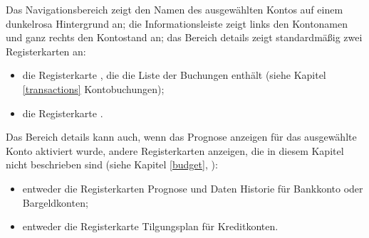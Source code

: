 Das Navigationsbereich zeigt den Namen des ausgewählten Kontos auf einem {\setlength{\fboxsep}{2pt}\colorbox[RGB]{235,149,149}{dunkelrosa}} {\setlength{\fboxsep}{2pt}\colorbox[RGB]{235,149,149}{Hintergrund}} an; die Informationsleiste zeigt links den Kontonamen und ganz rechts den Kontostand an; das Bereich details zeigt standardmäßig zwei Registerkarten an:
\begin{itemize}
	\item die Registerkarte , die die Liste der Buchungen enthält (siehe Kapitel \vref{transactions} Kontobuchungen);
	\item die Registerkarte .
\end{itemize}

Das Bereich details kann auch, wenn das Prognose anzeigen für das ausgewählte Konto aktiviert wurde, andere Registerkarten anzeigen, die in diesem Kapitel nicht beschrieben sind (siehe Kapitel \vref{budget}, ):
\begin{itemize}
	\item entweder die Registerkarten {Prognose} und {Daten Historie} für Bankkonto oder Bargeldkonten;
	\item entweder die Registerkarte {Tilgungsplan} für Kreditkonten.
\end{itemize}

